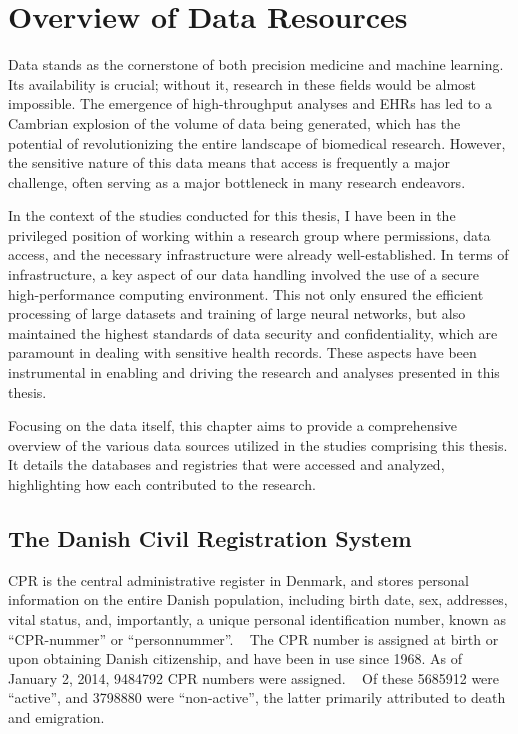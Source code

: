\chapter{Overview of Data Resources}

Data stands as the cornerstone of both precision medicine and machine learning.
Its availability is crucial; without it, research in these
fields would be almost impossible. 
The emergence of high-throughput analyses and \acp{EHR} has 
led to a Cambrian explosion of the volume of data being generated,
which has the potential of revolutionizing the 
entire landscape of biomedical research. 
However, the sensitive nature of this data means
that access is frequently a major challenge, 
often serving as a major bottleneck in
many research endeavors.

In the context of the studies conducted for this thesis, I have been in the
privileged position of working within a research group where permissions, 
data access, and the necessary infrastructure were already well-established.
In terms of infrastructure, a key aspect of our data handling involved the use 
of a secure high-performance computing environment. 
This not only ensured the efficient processing of large datasets and 
training of large neural networks, 
but also maintained the highest standards of data security and
confidentiality, which are paramount in dealing with sensitive health records.
These aspects have been instrumental in enabling and driving 
the research and analyses presented in this thesis.

Focusing on the data itself,
this chapter aims to provide a comprehensive overview of the various data
sources utilized in the studies comprising this thesis. It details the
databases and registries that were accessed and analyzed,
highlighting how each contributed to the research. 

\section{The Danish Civil Registration System}

\Ac{CPR} is the central administrative register in Denmark,
and stores personal information on the entire Danish population,
including birth date, sex, addresses, vital status, 
and, importantly, a unique personal identification number, 
known as \enquote{\ac{CPR}-nummer} or \enquote{personnummer}.
~\autocite{schmidtDanish2014}
The \ac{CPR} number is assigned at birth or upon obtaining Danish citizenship, 
and have been in use since 1968.
As of January 2, 2014, 
\num{9484792} \ac{CPR} numbers were assigned.
~\autocite{schmidtDanish2014}
Of these \num{5685912} were \enquote{active},
and \num{3798880} were \enquote{non-active},
the latter primarily attributed to death and emigration.
~\autocite{schmidtDanish2014}

